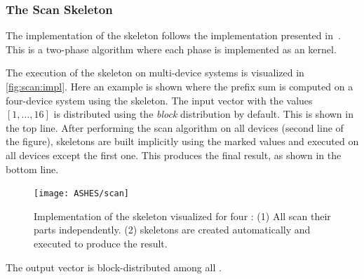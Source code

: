 \subsubsection{The Scan Skeleton}
The implementation of the \scan skeleton follows the implementation presented in~\cite{HarrisSeOw2007}.
This is a two-phase algorithm where each phase is implemented as an \OpenCL kernel.

The execution of the \scan skeleton on multi-device systems is visualized in \autoref{fig:scan:impl}.
Here an example is shown where the prefix sum is computed on a four-device system using the \scan skeleton.
The input vector with the values $[1,\ldots,16]$ is distributed using the \emph{block} distribution by default.
This is shown in the top line.
After performing the scan algorithm on all devices (second line of the figure), \map skeletons are built implicitly using the marked values and executed on all devices except the first one.
This produces the final result, as shown in the bottom line.

\begin{figure}[tbp]
    \centering
    \texttt{[image: ASHES/scan]}
    \caption[Implementation of the \scan skeleton.]%
            {Implementation of the \scan skeleton visualized for four \GPUs:
            (1) All \GPUs scan their parts independently.
            (2) \map skeletons are created automatically and
             executed to produce the result.}
    \label{fig:scan:impl}
\end{figure}

The output vector is block-distributed among all \GPUs.





